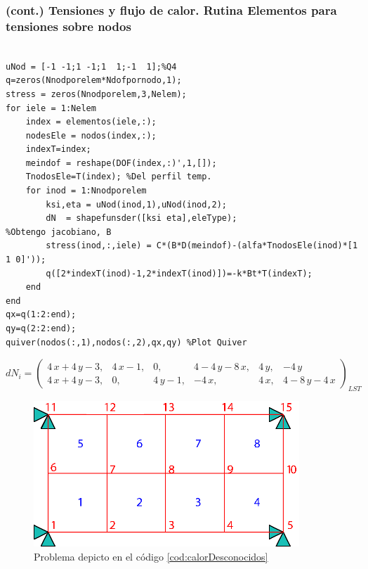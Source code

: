 \subsubsection*{(cont.) Tensiones y flujo de calor. Rutina Elementos para tensiones sobre nodos}
\begin{code}
\begin{verbatim}

uNod = [-1 -1;1 -1;1  1;-1  1];%Q4
q=zeros(Nnodporelem*Ndofpornodo,1);
stress = zeros(Nnodporelem,3,Nelem);
for iele = 1:Nelem
    index = elementos(iele,:);
    nodesEle = nodos(index,:);
    indexT=index;
    meindof = reshape(DOF(index,:)',1,[]);
    TnodosEle=T(index); %Del perfil temp.
    for inod = 1:Nnodporelem
        ksi,eta = uNod(inod,1),uNod(inod,2);
        dN  = shapefunsder([ksi eta],eleType);
%Obtengo jacobiano, B
        stress(inod,:,iele) = C*(B*D(meindof)-(alfa*TnodosEle(inod)*[1 1 0]'));
        q([2*indexT(inod)-1,2*indexT(inod)])=-k*Bt*T(indexT);
    end
end
qx=q(1:2:end);
qy=q(2:2:end);
quiver(nodos(:,1),nodos(:,2),qx,qy) %Plot Quiver
\end{verbatim}
\end{code}

$$
dN_i=\left(\begin{array}{cccccc} 4\,x+4\,y-3, & 4\,x-1, & 0, & 4-4\,y-8\,x, & 4\,y, & -4\,y\\ 4\,x+4\,y-3, & 0, & 4\,y-1, & -4\,x, & 4\,x, & 4-8\,y-4\,x \end{array}\right)_{LST}
$$
\begin{figure}
    \centering
    \includegraphics[width=10cm]{fig/problema_calor.eps}
    \caption{Problema depicto en el código \ref{cod:calorDesconocidos}}
    \label{fig:probCalor}
\end{figure}